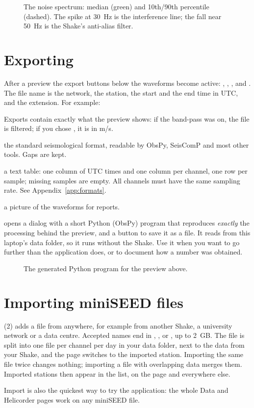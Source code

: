 \begin{figure}[tbp]
\centering
{}
\caption{The noise spectrum: median (green) and 10th/90th percentile (dashed). The spike at 30~Hz is the interference line; the fall
near 50~Hz is the Shake's anti-alias filter.}
\end{figure}

\section{Exporting}
After a preview the export buttons below the waveforms become active: , , ,  and
. The file name is the network, the station, the start and the end time in UTC, and the extension. For example:
\begin{center}\end{center}
Exports contain exactly what the preview shows: if the
band-pass was on, the file is filtered; if you chose , it is in m/s.

\begin{description}[leftmargin=3.2cm,style=nextline]
\item[miniSEED] the standard seismological format, readable by ObsPy, SeisComP and most other tools. Gaps are kept.
\item[CSV] a text table: one column of UTC times and one column per channel, one row per sample; missing samples are empty.
  All channels must have the same sampling rate. See Appendix~\ref{app:formats}.
\item[PNG, PDF] a picture of the waveforms for reports.
\item[</> Code] opens a dialog with a short Python (ObsPy) program that reproduces \emph{exactly} the processing behind the preview,
  and a button to save it as a  file. It reads from this laptop's data folder, so it runs without the Shake. Use it when
  you want to go further than the application does, or to document how a number was obtained.
\end{description}

\begin{figure}[tbp]
\centering
{}
\caption{The generated Python program for the preview above.}
\end{figure}

\section{Importing miniSEED files}
 (2) adds a file from anywhere, for example from another Shake, a university network or a data centre. Accepted
names end in , ,  or , up to 2~GB. The file is split into one file per channel
per day in your data folder, next to the data from your Shake, and the page switches to the imported station. Importing the same
file twice changes nothing; importing a file with overlapping data merges them. Imported stations then appear in the 
list, on the  page and everywhere else.

\begin{rs3dtip}
Import is also the quickest way to try the application: the whole Data and Helicorder pages work on any miniSEED file.
\end{rs3dtip}
